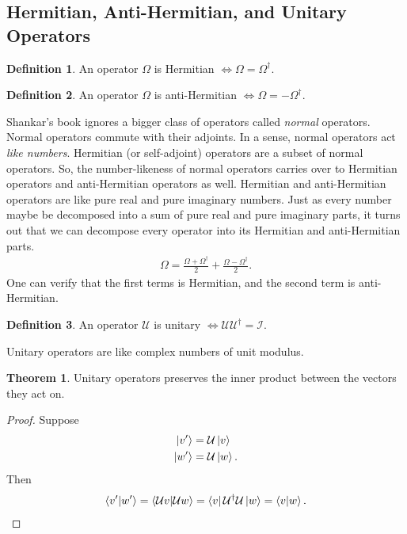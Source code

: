 \documentclass{book}
\theoremstyle{definition}
\newtheorem{defn}{Definition}[section]
\newtheorem{thm}{Theorem}[section]
\newcommand{\f}[2]{\frac{#1}{#2}}
\begin{document}
\subsection{Hermitian, Anti-Hermitian, and Unitary Operators}

\begin{defn}
	An operator $\Omega$ is Hermitian $\iff \Omega = \Omega^\dagger$.
\end{defn}


\begin{defn}
	An operator $\Omega$ is anti-Hermitian $\iff \Omega = -\Omega^\dagger$.
\end{defn}

Shankar's book ignores a bigger class of operators called \textit{normal} operators. Normal operators commute with their adjoints. In a sense, normal operators act \textit{like numbers}. Hermitian (or self-adjoint) operators are a subset of normal operators. So, the number-likeness of normal operators carries over to Hermitian operators and anti-Hermitian operators as well. Hermitian and anti-Hermitian operators are like pure real and pure imaginary numbers. Just as every number maybe be decomposed into a sum of pure real and pure imaginary parts, it turns out that we can decompose every operator into its Hermitian and anti-Hermitian parts. 
\begin{align}
\Omega = \f{\Omega + \Omega^\dagger}{2} + \f{\Omega - \Omega^\dagger}{2}.
\end{align}
One can verify that the first terms is Hermitian, and the second term is anti-Hermitian. 




\begin{defn}
	An operator $\mathcal{U}$ is unitary $\iff \mathcal{U}\mathcal{U}^\dagger = \mathcal{I}$. 
\end{defn}

Unitary operators are like complex numbers of unit modulus. 


\begin{thm}
	Unitary operators preserves the inner product between the vectors they act on.
	\begin{proof}
		Suppose
		\begin{align}
		\ket{v'} &= \mathcal{U}\ket{v}\\
		\ket{w'} &= \mathcal{U}\ket{w}.
		\end{align}
		Then
		\begin{align}
		\braket{v'}{w'} = \braket{\mathcal{U}v}{\mathcal{U}w} = \bra{v}\mathcal{U}^\dagger\mathcal{U}\ket{w} = \braket{v}{w}.
		\end{align}
	\end{proof}
\end{thm} 
\end{document}
